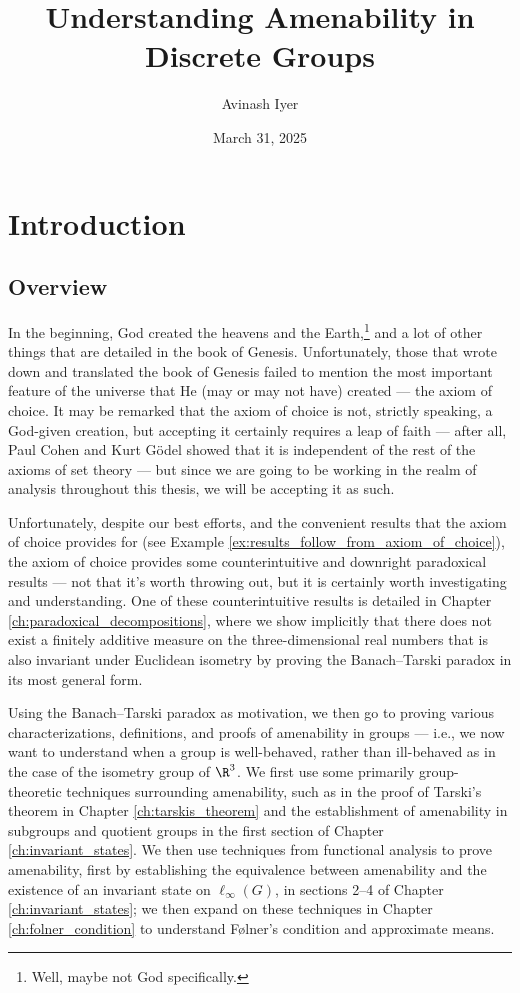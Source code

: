\documentclass[10pt]{package2}
\title{Understanding Amenability in Discrete Groups\\\vspace{5pt}{\large A Gentle Introduction to Higher Analysis}}
\author{Avinash Iyer}
\date{March 31, 2025}
\begin{document}
\maketitle
\RaggedRight
\tableofcontents
\chapter{Introduction}
\section{Overview}%
In the beginning, God created the heavens and the Earth,\footnote{Well, maybe not God specifically.} and a lot of other things that are detailed in the book of Genesis. Unfortunately, those that wrote down and translated the book of Genesis failed to mention the most important feature of the universe that He (may or may not have) created --- the axiom of choice. It may be remarked that the axiom of choice is not, strictly speaking, a God-given creation, but accepting it certainly requires a leap of faith --- after all, Paul Cohen and Kurt Gödel showed that it is independent of the rest of the axioms of set theory --- but since we are going to be working in the realm of analysis throughout this thesis, we will be accepting it as such.\newline

Unfortunately, despite our best efforts, and the convenient results that the axiom of choice provides for (see Example \ref{ex:results_follow_from_axiom_of_choice}), the axiom of choice provides some counterintuitive and downright paradoxical results --- not that it's worth throwing out, but it is certainly worth investigating and understanding. One of these counterintuitive results is detailed in Chapter \ref{ch:paradoxical_decompositions}, where we show implicitly that there does not exist a finitely additive measure on the three-dimensional real numbers that is also invariant under Euclidean isometry by proving the Banach--Tarski paradox in its most general form.\newline

Using the Banach--Tarski paradox as motivation, we then go to proving various characterizations, definitions, and proofs of amenability in groups --- i.e., we now want to understand when a group is well-behaved, rather than ill-behaved as in the case of the isometry group of $\R^3$. We first use some primarily group-theoretic techniques surrounding amenability, such as in the proof of Tarski's theorem in Chapter \ref{ch:tarskis_theorem} and the establishment of amenability in subgroups and quotient groups in the first section of Chapter \ref{ch:invariant_states}. We then use techniques from functional analysis to prove amenability, first by establishing the equivalence between amenability and the existence of an invariant state on $\ell_{\infty}(G)$, in sections 2--4 of Chapter \ref{ch:invariant_states}; we then expand on these techniques in Chapter \ref{ch:folner_condition} to understand Følner's condition and approximate means.\newline
\end{document}
